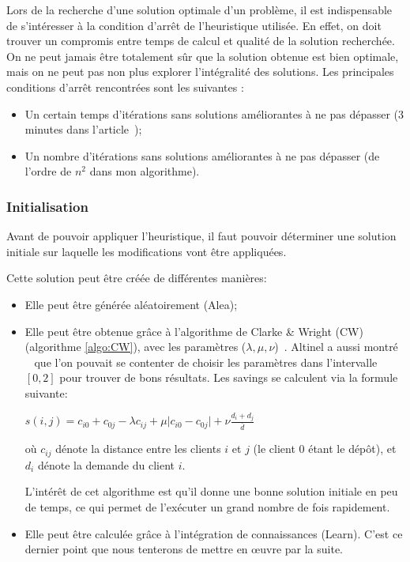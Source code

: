 \documentclass[a4paper,11pt]{article}%
\begin{document}
Lors de la recherche d'une solution optimale d'un problème, il est indispensable de s'intéresser à la condition d'arrêt de l'heuristique utilisée. 
En effet, on doit trouver un compromis entre temps de calcul et qualité de la solution recherchée. 
On ne peut jamais être totalement sûr que la solution obtenue est bien optimale, mais on ne peut pas non plus explorer l'intégralité des solutions. 
Les principales conditions d'arrêt rencontrées sont les suivantes :
\begin{itemize}
\item Un certain temps d'itérations sans solutions améliorantes à ne pas dépasser (3 minutes dans l'article~\cite{Sorensen_2017});
\item Un nombre d'itérations sans solutions améliorantes à ne pas dépasser (de l'ordre de $n^2$ dans mon algorithme). 
\end{itemize}

\subsubsection{Initialisation}
Avant de pouvoir appliquer l'heuristique, il faut pouvoir déterminer une solution initiale sur laquelle les modifications vont être appliquées. 

Cette solution peut être créée de différentes manières:

\begin{itemize}
\item Elle peut être générée aléatoirement (Alea);
\item Elle peut être obtenue grâce à l'algorithme de Clarke \& Wright (CW) (algorithme \ref{algo:CW}), avec les paramètres ($\lambda,\mu,\nu$)~\cite{Altinel_2005}. 
Altinel a aussi montré ~\cite{Altinel_2005} que l'on pouvait se contenter de choisir les paramètres dans l'intervalle $[0,2]$ pour trouver de bons résultats. 
Les savings se calculent via la formule suivante:

\begin{center}
$s(i,j) = c_{i0} + c_{0j} - \lambda c_{ij} + \mu \vert c_{i0} - c_{0j} \vert + \nu \frac{d_i + d_j}{\overline{d}}$
\end{center}

où $c_{ij}$ dénote la distance entre les clients $i$ et $j$ (le client 0 étant le dépôt), et $d_i$ dénote la demande du client $i$. 

L'intérêt de cet algorithme est qu'il donne une bonne solution initiale en peu de temps, ce qui permet de l'exécuter un grand nombre de fois rapidement.
\item Elle peut être calculée grâce à l'intégration de connaissances (Learn). C'est ce dernier point que nous tenterons de mettre en œuvre par la suite.
\end{itemize}
\end{document}
